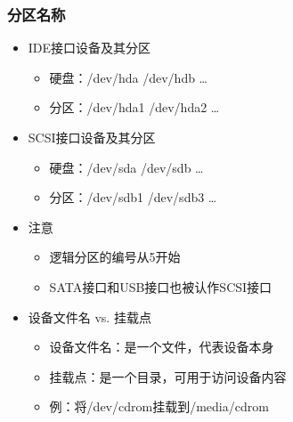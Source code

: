 \documentclass[xcolor=svgnames,presentation]{beamer}
\begin{document}
\begin{frame}
\frametitle{分区名称}
\label{sec-3-2-4}
\begin{itemize}

\item IDE接口设备及其分区
\label{sec-3-2-4-1}%
\begin{itemize}

\item 硬盘：/dev/hda /dev/hdb \ldots{}
\label{sec-3-2-4-1-1}%

\item 分区：/dev/hda1 /dev/hda2 \ldots{}
\label{sec-3-2-4-1-2}%
\end{itemize} %

\item SCSI接口设备及其分区
\label{sec-3-2-4-2}%
\begin{itemize}

\item 硬盘：/dev/sda /dev/sdb \ldots{}
\label{sec-3-2-4-2-1}%

\item 分区：/dev/sdb1 /dev/sdb3 \ldots{}
\label{sec-3-2-4-2-2}%
\end{itemize} %

\item 注意
\label{sec-3-2-4-3}%
\begin{itemize}

\item 逻辑分区的编号从5开始
\label{sec-3-2-4-3-1}%

\item SATA接口和USB接口也被认作SCSI接口
\label{sec-3-2-4-3-2}%
\end{itemize} %

\item 设备文件名 vs. 挂载点
\label{sec-3-2-4-4}%
\begin{itemize}

\item 设备文件名：是一个文件，代表设备本身
\label{sec-3-2-4-4-1}%

\item 挂载点：是一个目录，可用于访问设备内容
\label{sec-3-2-4-4-2}%

\item 例：将/dev/cdrom挂载到/media/cdrom
\label{sec-3-2-4-4-3}%
\end{itemize} %
\end{itemize} %
\end{frame}
\end{document}
